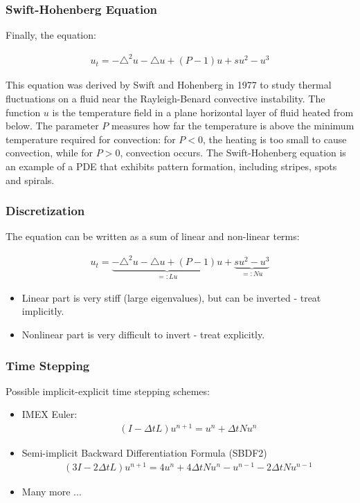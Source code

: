 \documentclass{beamer}
\begin{document}
\begin{frame}
\frametitle{Swift-Hohenberg Equation}
 
Finally, the equation:

\begin{gather*}
u_t = -\triangle^2 u - \triangle u + (P-1)u + su^2 - u^3
\end{gather*} 
 
This equation was derived by Swift and Hohenberg in 1977 to study thermal fluctuations on a fluid near the Rayleigh-Benard
convective instability. The function $u$ is the temperature field in a plane horizontal layer of fluid heated from below. 
The parameter $P$ measures how far the temperature is above the minimum temperature required for convection: for $P<0$,
the heating is too small to cause convection, while for $P>0$, convection occurs. The Swift-Hohenberg equation is an example of 
a PDE that exhibits pattern formation, including stripes, spots and spirals.
 
\end{frame}
 
 
 
\begin{frame}
\frametitle{Discretization}
 
The equation can be written as a sum of linear and non-linear terms: 
 
\begin{gather*}
u_t = \underbrace{-\triangle^2 u - \triangle u + (P-1)u}_{=:Lu} + \underbrace{su^2 - u^3}_{=:Nu}
\end{gather*} 
 
\begin{itemize}
\item Linear part is very stiff (large eigenvalues), but can be inverted - treat implicitly.
\item Nonlinear part is very difficult to invert - treat explicitly.  
\end{itemize} 
 
\end{frame} 



\begin{frame}
\frametitle{Time Stepping}
 
Possible implicit-explicit time stepping schemes: \vspace{5mm}
 
\begin{itemize}
\item IMEX Euler:
\begin{gather*}
\left( I - \Delta t L \right) u^{n+1} = u^n + \Delta t N u^n
\end{gather*}
\item Semi-implicit Backward Differentiation Formula (SBDF2)
\begin{gather*}
\left( 3I - 2\Delta t L \right) u^{n+1} = 4u^n + 4\Delta t Nu^n - u^{n-1} - 2\Delta t Nu^{n-1} 
\end{gather*}   
\item Many more ...
\end{itemize} 
 
\end{frame} 
\end{document}
